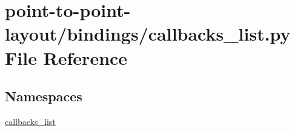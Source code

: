 \hypertarget{point-to-point-layout_2bindings_2callbacks__list_8py}{}\section{point-\/to-\/point-\/layout/bindings/callbacks\+\_\+list.py File Reference}
\label{point-to-point-layout_2bindings_2callbacks__list_8py}
\subsection*{Namespaces}
\begin{DoxyCompactItemize}
\item 
 \hyperlink{namespacecallbacks__list}{callbacks\+\_\+list}
\end{DoxyCompactItemize}
